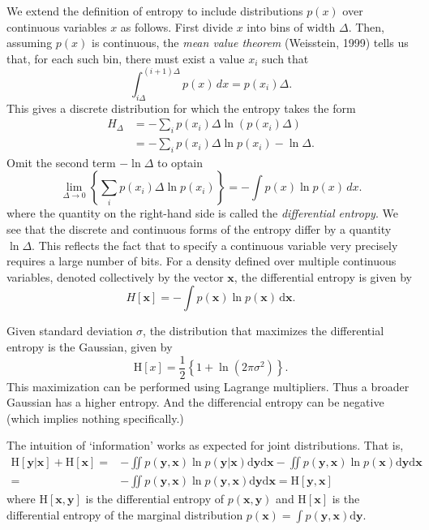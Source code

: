 We extend the definition of entropy to include distributions $p(x)$ over continuous variables $x$ as follows. First divide $x$ into bins of width $\Delta$. Then, assuming $p(x)$ is continuous, the \textit{mean value theorem} (Weisstein, 1999) tells us that, for each such bin, there must exist a value $x_i$ such that
\begin{equation*}
  \int_{i\Delta}^{(i+1)\Delta} p(x) \, dx = p(x_i)\Delta.
\end{equation*}
This gives a discrete distribution for which the entropy takes the form
\begin{align*}
  H_\Delta & = -\sum_i p(x_i)\Delta \ln \left( p(x_i)\Delta \right) \nonumber \\
           & = -\sum_i p(x_i)\Delta \ln p(x_i) - \ln \Delta.
\end{align*}
Omit the second term $-\ln \Delta$ to optain
\begin{equation*}
  \lim_{\Delta \to 0} \left\{ \sum_i p(x_i)\Delta \ln p(x_i) \right\}
  = -\int p(x)\ln p(x) \, dx.
\end{equation*}
where the quantity on the right-hand side is called the \textit{differential entropy}. We see that the discrete and continuous forms of the entropy differ by a quantity $\ln \Delta$. This reflects the fact that to specify a continuous variable very precisely requires a large number of bits. For a density defined over multiple continuous variables, denoted collectively by the vector $\mathbf{x}$, the differential entropy is given by
\begin{equation*}
  H[\mathbf{x}] = - \int p(\mathbf{x}) \ln p(\mathbf{x}) \, \mathrm{d}\mathbf{x}.
\end{equation*}

Given standard deviation $\sigma$, the distribution that maximizes the differential entropy is the Gaussian, given by
\[
  \mathrm{H}[x]=\frac{1}{2}\left\{1+\ln(2\pi \sigma^2)\right\}.
\]
This maximization can be performed using Lagrange multipliers. Thus a broader Gaussian has a higher entropy. And the differencial entropy can be negative (which implies nothing specifically.)

The intuition of `information' works as expected for joint distributions. That is,
\begin{align*}
  \mathrm{H}[\mathbf{y|x}]+\mathrm{H}[\mathbf{x}]= &
  -\iint p(\mathbf{y,x})\ln p(\mathbf{y|x})\mathrm{d}\mathbf{y}\mathrm{d}\mathbf{x}-\iint p(\mathbf{y,x})\ln p(\mathbf{x})\mathrm{d}\mathbf{y}\mathrm{d}\mathbf{x} \\=&
  -\iint p(\mathbf{y,x})\ln p(\mathbf{y,x})\mathrm{d}\mathbf{y}\mathrm{d}\mathbf{x}=\mathrm{H}[\mathbf{y,x}]
\end{align*}
where $\mathrm{H}[\mathbf{x,y}]$ is the differential entropy of $p(\mathbf{x,y})$ and $\mathrm{H}[\mathbf{x}]$ is the differential entropy of the marginal distribution $p(\mathbf{x})=\displaystyle\int p(\mathbf{y,x})\mathrm{d}\mathbf{y}$.

